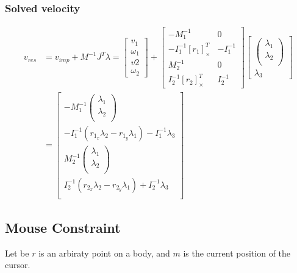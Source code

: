 \documentclass{article}
\begin{document}
	\subsubsection{Solved velocity}
		\begin{align*}
			v_{res}&=v_{imp}+M^{-1}J^T\lambda=
			\begin{bmatrix}
				v_1\\
				\omega_1\\
				v2\\
				\omega_2
			\end{bmatrix}
			+
			\begin{bmatrix}
				-M_1^{-1} & 0\\
				-I_1^{-1}[r_1]_\times^T & -I_1^{-1}\\
				M_2^{-1} & 0\\
				I_2^{-1}[r_2]_\times^T & I_2^{-1}
			\end{bmatrix}
			\begin{bmatrix}
				\begin{pmatrix}
					\lambda_1\\
					\lambda_2\\					
				\end{pmatrix}\\
				\lambda_3
			\end{bmatrix}\\
			&=
			\begin{bmatrix}
				-M_1^{-1}
				\begin{pmatrix}
					\lambda_1\\
					\lambda_2\\					
				\end{pmatrix}\\
				-I_1^{-1}(r_{1_x}\lambda_2 - r_{1_y}\lambda_1) -I_1^{-1}\lambda_3\\
				M_2^{-1}
				\begin{pmatrix}
					\lambda_1\\
					\lambda_2\\					
				\end{pmatrix}\\
				I_2^{-1}(r_{2_x}\lambda_2 - r_{2_y}\lambda_1) +I_2^{-1}\lambda_3\\
			\end{bmatrix}
		\end{align*}
	\newpage
	\subsection{Mouse Constraint}
	Let be $r$ is an arbiraty point on a body, and $m$ is the current position of the cursor.
\end{document}
